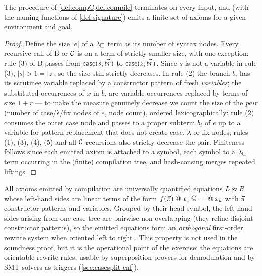 \begin{lemma}
\label{lem:compile-term}
The procedure of \cref{def:compC,def:compile} terminates on every input,
and (with the naming functions of \cref{def:signature}) emits a finite set
of axioms for a given environment and goal.
\end{lemma}

\begin{proof}
Define the size $|e|$ of a $\lambda_{\square}$ term as its number of syntax nodes.
Every recursive call of $\mathrm{B}$ or $\mathcal{C}$ is on a term of strictly
smaller size, with one exception: rule (3) of $\mathrm{B}$ passes from
$\mathsf{case}(s; \vec{br})$ to $\mathsf{case}(z; \vec{br})$.  Since $s$
is not a variable in rule (3), $|s| > 1 = |z|$, so the size still strictly
decreases.  In rule (2) the branch $b_i$ has its scrutinee variable
replaced by a constructor pattern of fresh \emph{variables}; the
substituted occurrences of $x$ in $b_i$ are variable occurrences replaced
by terms of size $1 + r$ --- to make the measure genuinely decrease we
count the size of the \emph{pair} (number of case/λ/fix nodes of $e$, node
count), ordered lexicographically: rule (2) consumes the outer case node
and passes to a proper subterm $b_i$ of $e$ up to a variable-for-pattern
replacement that does not create case, $\lambda$ or fix nodes; rules (1),
(3), (4), (5) and all $\mathcal{C}$ recursions also strictly decrease the pair.
Finiteness follows since each emitted axiom is attached to a symbol, each
symbol to a $\lambda_{\square}$ term occurring in the (finite) compilation tree, and
hash-consing merges repeated liftings.
\end{proof}

\begin{remark}
\label{rem:eq-shape}
All axioms emitted by compilation are universally quantified equations
$L \approx R$ whose left-hand sides are linear terms of the form
$f(\vec{\pi}) \mathbin{@} x_1 \mathbin{@} \cdots \mathbin{@} x_k$ with $\vec{\pi}$
constructor patterns and variables.  Grouped by their head symbol, the
left-hand sides arising from one case tree are pairwise non-overlapping
(they refine disjoint constructor patterns), so the emitted equations form
an \emph{orthogonal} first-order rewrite system when oriented left to
right \cite{BaaderNipkow1998}.  This property is not used in the soundness
proof, but it is the operational point of the exercise: the equations are
orientable rewrite rules, usable by superposition provers for demodulation
and by SMT solvers as triggers (\cref{sec:casesplit-cnf}).
\end{remark}


